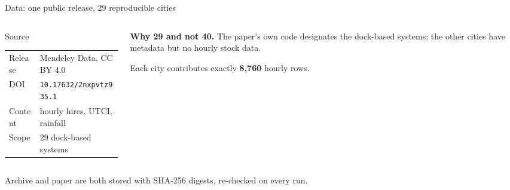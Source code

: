 \documentclass[aspectratio=169,11pt]{beamer}
\newcommand{\hl}[1]{{\color{csPurple}\bfseries #1}}
\begin{document}
\begin{frame}{Data: one public release, 29 reproducible cities}
  \small
  \begin{columns}[T,onlytextwidth]
    \begin{column}{0.52\textwidth}
      \begin{block}{Source}
        \begin{tabular}{@{}p{2.2cm}p{4.2cm}@{}}
          Release & Mendeley Data, CC BY 4.0 \\[0.2em]
          DOI & \texttt{10.17632/2nxpvtz935.1} \\[0.2em]
          Content & hourly hires, UTCI, rainfall \\[0.2em]
          Scope & 29 dock-based systems
        \end{tabular}
      \end{block}
    \end{column}
    \begin{column}{0.44\textwidth}
      \textbf{Why 29 and not 40.} The paper's own code designates the dock-based
      systems; the other cities have metadata but no hourly stock data.

      \vspace{0.28cm}
      Each city contributes exactly \hl{8{,}760} hourly rows.
    \end{column}
  \end{columns}
  \vspace{0.30cm}
  \centering
  \footnotesize Archive and paper are both stored with SHA-256 digests, re-checked on every run.
\end{frame}
\end{document}
